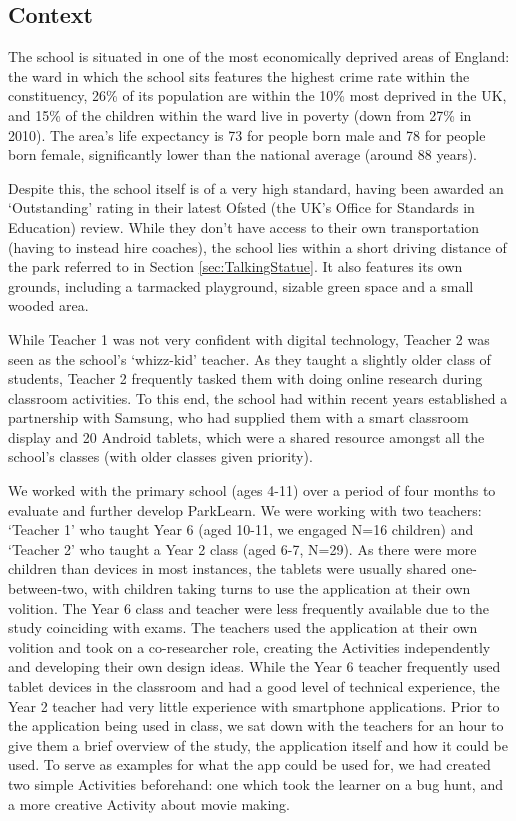 \subsection{Context}
The school is situated in one of the most economically deprived areas of England: the ward in which the school sits features the highest crime rate within the constituency, 26\% of its population are within the 10\% most deprived in the UK, and 15\% of the children within the ward live in poverty (down from 27\% in 2010). The area's life expectancy is 73 for people born male and 78 for people born female, significantly lower than the national average (around 88 years).

Despite this, the school itself is of a very high standard, having been awarded an `Outstanding' rating in their latest Ofsted (the UK’s Office for Standards in Education) review. While they don't have access to their own transportation (having to instead hire coaches), the school lies within a short driving distance of the park referred to in Section \ref{sec:TalkingStatue}. It also features its own grounds, including a tarmacked playground, sizable green space and a small wooded area. 

While Teacher 1 was not very confident with digital technology, Teacher 2 was seen as the school's `whizz-kid' teacher. As they taught a slightly older class of students, Teacher 2 frequently tasked them with doing online research during classroom activities. To this end, the school had within recent years established a partnership with Samsung, who had supplied them with a smart classroom display and 20 Android tablets, which were a shared resource amongst all the school’s classes (with older classes given priority).

We worked with the primary school (ages 4-11) over a period of four months to evaluate and further develop ParkLearn. We were working with two teachers: ‘Teacher 1’ who taught Year 6 (aged 10-11, we engaged N=16 children) and ‘Teacher 2’ who taught a Year 2 class (aged 6-7, N=29). As there were more children than devices in most instances, the tablets were usually shared one-between-two, with children taking turns to use the application at their own volition. The Year 6 class and teacher were less frequently available due to the study coinciding with exams. The teachers used the application at their own volition and took on a co-researcher role, creating the Activities independently and developing their own design ideas. While the Year 6 teacher frequently used tablet devices in the classroom and had a good level of technical experience, the Year 2 teacher had very little experience with smartphone applications. Prior to the application being used in class, we sat down with the teachers for an hour to give them a brief overview of the study, the application itself and how it could be used. To serve as examples for what the app could be used for, we had created two simple Activities beforehand: one which took the learner on a bug hunt, and a more creative Activity about movie making.

